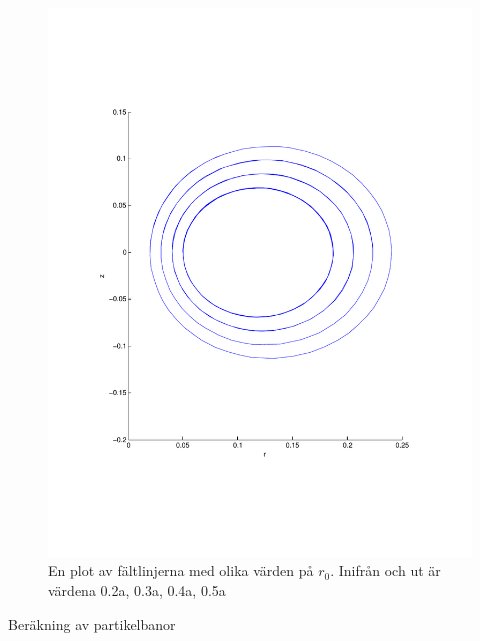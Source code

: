 \documentclass[a4paper]{article}
\begin{document}
\begin{figure}
  \center
  \caption{En plot av fältlinjerna med olika värden på $r_0$. Inifrån och ut är
  värdena 0.2a, 0.3a, 0.4a, 0.5a}
    \includegraphics[scale=0.5,trim=6pc 11pc 6pc 11pc,clip]{ovals.pdf}
\end{figure}

\clearpage
\centerline{\sc Beräkning av partikelbanor}
\vspace{2pc}
\end{document}

